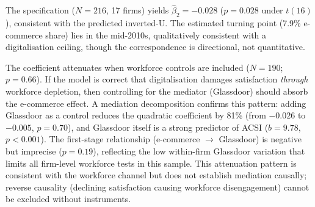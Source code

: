 \documentclass[msom,dblanonrev]{informs4}
\begin{document}
The specification ($N = 216$, 17 firms) yields $\hat{\beta}_2 = -0.028$ ($p = 0.028$ under $t(16)$), consistent with the predicted inverted-U. The estimated turning point (7.9\% e-commerce share) lies in the mid-2010s, qualitatively consistent with a digitalisation ceiling, though the correspondence is directional, not quantitative.

The coefficient attenuates when workforce controls are included ($N = 190$; $p = 0.66$). If the model is correct that digitalisation damages satisfaction \emph{through} workforce depletion, then controlling for the mediator (Glassdoor) should absorb the e-commerce effect. A mediation decomposition confirms this pattern: adding Glassdoor as a control reduces the quadratic coefficient by 81\% (from $-0.026$ to $-0.005$, $p = 0.70$), and Glassdoor itself is a strong predictor of ACSI ($b = 9.78$, $p < 0.001$). The first-stage relationship (e-commerce $\to$ Glassdoor) is negative but imprecise ($p = 0.19$), reflecting the low within-firm Glassdoor variation that limits all firm-level workforce tests in this sample. This attenuation pattern is consistent with the workforce channel but does not establish mediation causally; reverse causality (declining satisfaction causing workforce disengagement) cannot be excluded without instruments.
\end{document}
